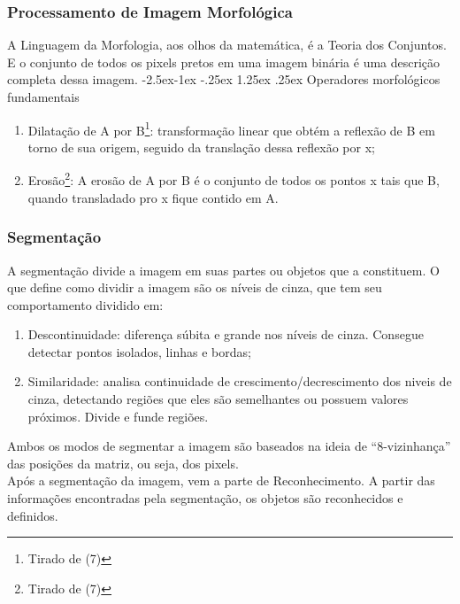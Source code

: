 \documentclass{article}
\makeatletter
\renewcommand\paragraph{\@startsection{paragraph}{4}{\z@}%
            {-2.5ex\@plus -1ex \@minus -.25ex}%
            {1.25ex \@plus .25ex}%
            {\normalfont\normalsize\bfseries}}
\makeatother
\begin{document}
            \subsubsection{Processamento de Imagem Morfológica}
            A Linguagem da Morfologia, aos olhos da matemática, é a Teoria dos Conjuntos. E o conjunto de todos os pixels pretos em uma imagem binária é uma descrição completa dessa imagem.
                \paragraph{Operadores morfológicos fundamentais}
                
                \begin{enumerate}
                
                \item Dilatação de A por B\footnote{Tirado de (7)}: transformação linear que obtém a reflexão de B em torno de sua origem, seguido da translação dessa reflexão por x; 
                
                \item Erosão\footnote{Tirado de (7)}: A erosão de A por B é o conjunto de todos os pontos x tais que B, quando transladado pro x fique contido em A.
                
                \end{enumerate}
                
            \subsubsection{Segmentação}
            A segmentação divide a imagem em suas partes ou objetos que a constituem. O que define como dividir a imagem são os níveis de cinza, que tem seu comportamento dividido em:
            
            \begin{enumerate}
            
            \item Descontinuidade: diferença súbita e grande nos níveis de cinza. Consegue detectar pontos isolados, linhas e bordas;
            
            \item Similaridade: analisa continuidade de crescimento/decrescimento dos niveis de cinza, detectando regiões que eles são semelhantes ou possuem valores próximos. Divide e funde regiões.
            
            \end{enumerate}
            Ambos os modos de segmentar a imagem são baseados na ideia de ``8-vizinhança'' das posições da matriz, ou seja, dos pixels.\\
            Após a segmentação da imagem, vem a parte de Reconhecimento. A partir das informações encontradas pela segmentação, os objetos são reconhecidos e definidos.
            
\end{document}
